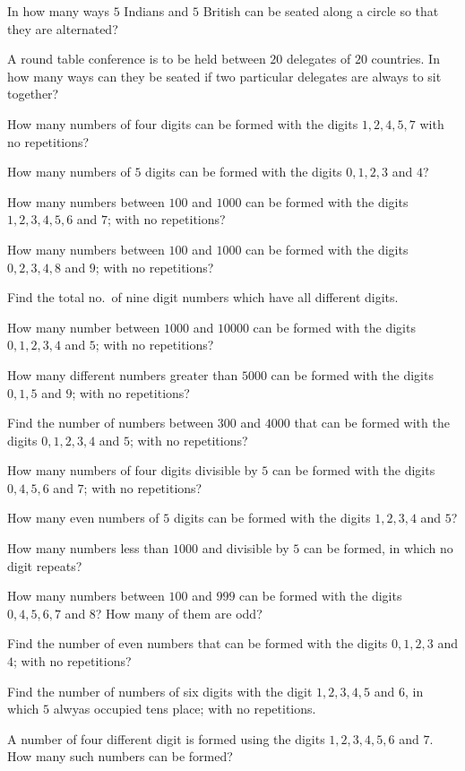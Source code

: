   \stopitemize
\item In how many ways $5$ Indians and $5$ British can be seated along a circle so that they are alternated?
\item A round table conference is to be held between $20$ delegates of $20$ countries. In how many ways can they be seated if two
  particular delegates are always to sit together?
\item How many numbers of four digits can be formed with the digits $1, 2, 4, 5, 7$ with no repetitions?
\item How many numbers of $5$ digits can be formed with the digits $0, 1, 2, 3$ and $4$?
\item How many numbers between $100$ and $1000$ can be formed with the digits $1, 2, 3, 4, 5, 6$ and $7$; with no repetitions?
\item How many numbers between $100$ and $1000$ can be formed with the digits $0, 2, 3, 4, 8$ and $9$; with no repetitions?
\item Find the total no.\ of nine digit numbers which have all different digits.
\item How many number between $1000$ and $10000$ can be formed with the digits $0, 1, 2, 3, 4$ and $5$; with no repetitions?
\item How many different numbers greater than $5000$ can be formed with the digits $0, 1, 5$ and $9$; with no repetitions?
\item Find the number of numbers between $300$ and $4000$ that can be formed with the digits $0, 1, 2, 3, 4$ and $5$; with no
  repetitions?
\item How many numbers of four digits divisible by $5$ can be formed with the digits $0, 4, 5, 6$ and $7$; with no repetitions?
\item How many even numbers of $5$ digits can be formed with the digits $1, 2, 3, 4$ and $5$?
\item How many numbers less than $1000$ and divisible by $5$ can be formed, in which no digit repeats?
\item How many numbers between $100$ and $999$ can be formed with the digits $0, 4, 5, 6, 7$ and $8$? How many of them are odd?
\item Find the number of even numbers that can be formed with the digits $0, 1, 2, 3$ and $4$; with no repetitions?
\item Find the number of numbers of six digits with the digit $1, 2, 3, 4 ,5$ and $6$, in which $5$ alwyas occupied tens place;
  with no repetitions.
\item A number of four different digit is formed using the digits $1, 2, 3, 4, 5, 6$ and $7$. How many such numbers can be formed?
